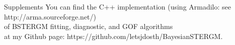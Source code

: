 \documentclass[aspectratio=169,ignorenonframetext,9pt]{beamer}
\theoremstyle{plain}
\theoremstyle{definition}
\begin{document}
\begin{frame}{Supplements}
    You can find the C++ implementation (using Armadilo: see http://arma.sourceforge.net/)
    \\ of BSTERGM fitting, diagnostic, and GOF algorithms
    \\ at my Github page: https://github.com/letsjdosth/BayesianSTERGM.
\end{frame}



\nocite{*}


\end{document}
